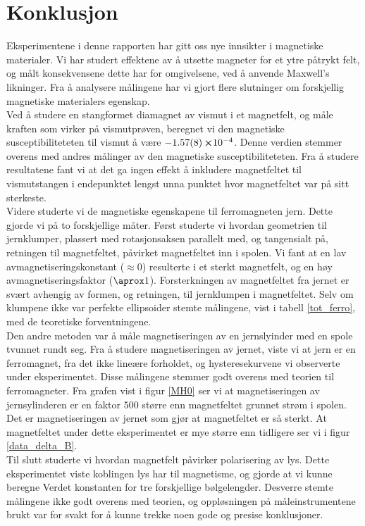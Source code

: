 \documentclass[%
 reprint,
 amsmath,amssymb,
 aps,
 norsk,
]{revtex4-1}
\begin{document}
\section{Konklusjon}
Eksperimentene i denne rapporten har gitt oss nye innsikter i magnetiske materialer. Vi har studert effektene av å utsette magneter for et ytre påtrykt felt, og målt konsekvensene dette har for omgivelsene, ved å anvende Maxwell's likninger. Fra å analysere målingene har vi gjort flere slutninger om forskjellig magnetiske materialers egenskap.\\
Ved å studere en stangformet diamagnet av vismut i et magnetfelt, og måle kraften som virker på vismutprøven, beregnet vi den magnetiske susceptibiliteteten til vismut å være $-\SI{1.57\pm0.08}\cross 10^{-4}$. Denne verdien stemmer overens med andres målinger av den magnetiske susceptibiliteteten. Fra å studere resultatene fant vi at det ga ingen effekt å inkludere magnetfeltet til vismutstangen i endepunktet lengst unna punktet hvor magnetfeltet var på sitt sterkeste.\\
Videre studerte vi de magnetiske egenskapene til ferromagneten jern. Dette gjorde vi på to forskjellige måter. Først studerte vi hvordan geometrien til jernklumper, plassert med rotasjonsaksen parallelt med, og tangensialt på, retningen til magnetfeltet, påvirket magnetfeltet inn i spolen. Vi fant at en lav avmagnetiseringskonstant ($\approx 0$) resulterte i et sterkt magnetfelt, og en høy avmagnetiseringsfaktor ($\aprox 1$). Forsterkningen av magnetfeltet fra jernet er svært avhengig av formen, og retningen, til jernklumpen i magnetfeltet. Selv om klumpene ikke var perfekte ellipsoider stemte målingene, vist i tabell \vref{tot_ferro}, med de teoretiske forventningene.\\
Den andre metoden var å måle magnetiseringen av en jernslyinder med en spole tvunnet rundt seg. Fra å studere magnetiseringen av jernet, viste vi at jern er en ferromagnet, fra det ikke lineære forholdet, og hysteresekurvene vi observerte under eksperimentet. Disse målingene stemmer godt overens med teorien til ferromagneter. Fra grafen vist i figur \vref{MH0} ser vi at magnetiseringen av jernsylinderen er en faktor $500$ større enn magnetfeltet grunnet strøm i spolen. Det er magnetiseringen av jernet som gjør at magnetfeltet er så sterkt. At magnetfeltet under dette eksperimentet er mye større enn tidligere ser vi i figur \vref{data_delta_B}. \\
Til slutt studerte vi hvordan magnetfelt påvirker polarisering av lys. Dette eksperimentet viste koblingen lys har til magnetisme, og gjorde at vi kunne beregne Verdet konstanten for tre forskjellige bølgelengder. Desverre stemte målingene ikke godt overens med teorien, og oppløsningen på måleinstrumentene brukt var for svakt for å kunne trekke noen gode og presise konklusjoner.
{}

\end{document}
